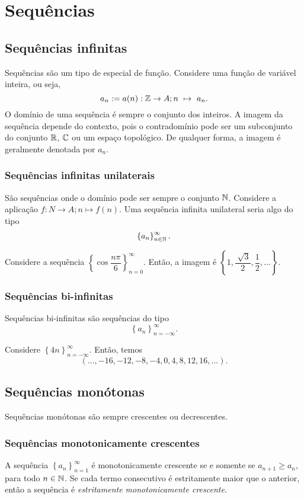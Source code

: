 \section{Sequências}
   \subsection{Sequências infinitas}
      Sequências são um tipo de especial de função. 
      Considere uma função de variável inteira, ou seja, 
      $$a_{n} := a(n): \mathbb{Z} \to A; n\ \mapsto\ a_{n}.$$
      O domínio de uma sequência é sempre o conjunto dos inteiros. 
      A imagem da sequência depende do contexto, pois o 
      contradomínio pode ser um subconjunto do conjunto 
      $\mathbb{R}$, $\mathbb{C}$ ou um espaço topológico. 
      De qualquer forma, a imagem é geralmente denotada por $a_{n}$.
      \subsubsection{Sequências infinitas unilaterais}
          São sequências onde o domínio pode ser sempre o conjunto $\mathbb{N}$. 
          Considere a aplicação $f: N \to A; n \mapsto f(n).$ 
          Uma sequência infinita unilateral seria algo do tipo 
          $$\left\{a_{n}\right\}^{\infty}_{n \in \mathbb{N}}.$$
         \begin{exmp}
            Considere a sequência $\left\{\cos{\dfrac{n\pi}{6}}\right\}
            ^{\infty}_{n=0}$. Então, a imagem é $\left\{1,
            \dfrac{\sqrt[]{3}}{2}, \dfrac{1}{2}, ...\right\}.$
         \end{exmp}
      
      \subsubsection{Sequências bi-infinitas}
         Sequências bi-infinitas são sequências do tipo 
         $$\left\{a_{n}\right\}^{\infty}_{n=-\infty}.$$
         \begin{exmp}
            Considere $\left\{4n\right\}^{\infty}_{n=-\infty}$. 
            Então, temos $$(..., -16,-12,-8,-4,0,4,8,12,16,...).$$
         \end{exmp}
   \subsection{Sequências monótonas}
      Sequências monótonas são sempre crescentes ou decrescentes. 
         \subsubsection{Sequências monotonicamente crescentes}
               A sequência $\left\{a_{n}\right\}^{\infty}_{n=1}$ 
               é monotonicamente crescente se e somente se 
               $a_{n+1} \geq a_{n}$, para todo $n \in \mathbb{N}$. 
               Se cada termo consecutivo é estritamente maior que o 
               anterior, então a sequência é \emph{estritamente 
               monotonicamente crescente}.
